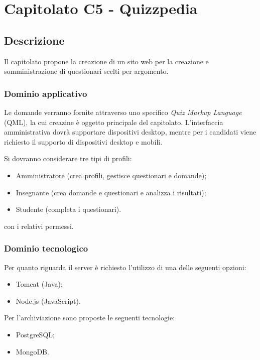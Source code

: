 \documentclass[12pt,a4paper]{article}
\begin{document}
\newpage
\section{Capitolato C5 - Quizzpedia}
\subsection{Descrizione}

Il capitolato propone la creazione di un sito web per la creazione e somministrazione di questionari scelti
per argomento.

\subsubsection{Dominio applicativo}

Le domande verranno fornite attraverso uno specifico \textit{Quiz Markup Language} (QML), la cui creazine
è oggetto principale del capitolato.
L'interfaccia amministrativa dovrà supportare dispositivi desktop, mentre per i candidati viene richiesto 
il supporto di dispositivi desktop e mobili.

Si dovranno considerare tre tipi di profili:

\begin{itemize}
\item Amministratore (crea profili, gestisce questionari e domande);
\item Insegnante (crea domande e questionari e analizza i risultati);
\item Studente (completa i questionari).
\end{itemize}

con i relativi permessi.

\subsubsection{Dominio tecnologico}

Per quanto riguarda il server è richiesto l'utilizzo di una delle seguenti opzioni:

\begin{itemize}
\item Tomcat (Java);
\item Node.js (JavaScript).
\end{itemize}

Per l'archiviazione sono proposte le seguenti tecnologie:

\begin{itemize}
\item PostgreSQL;
\item MongoDB.
\end{itemize}
\end{document}
